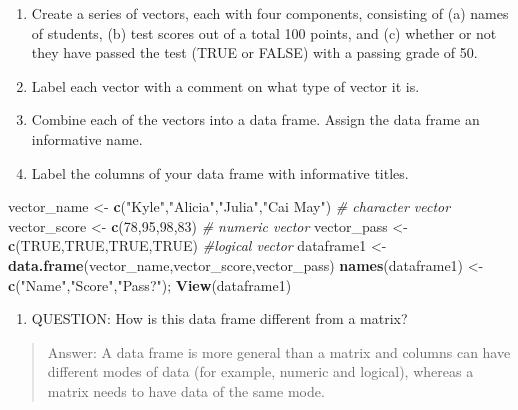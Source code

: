 \documentclass[]{article}
\newenvironment{Shaded}{\begin{snugshade}}{\end{snugshade}}
\newcommand{\CommentTok}[1]{\textcolor[rgb]{0.56,0.35,0.01}{\textit{#1}}}
\newcommand{\DecValTok}[1]{\textcolor[rgb]{0.00,0.00,0.81}{#1}}
\newcommand{\KeywordTok}[1]{\textcolor[rgb]{0.13,0.29,0.53}{\textbf{#1}}}
\newcommand{\NormalTok}[1]{#1}
\newcommand{\OtherTok}[1]{\textcolor[rgb]{0.56,0.35,0.01}{#1}}
\newcommand{\StringTok}[1]{\textcolor[rgb]{0.31,0.60,0.02}{#1}}
\providecommand{\tightlist}{%
  \setlength{\itemsep}{0pt}\setlength{\parskip}{0pt}}
\begin{document}
\begin{enumerate}
\def\labelenumi{\arabic{enumi}.}
\setcounter{enumi}{4}
\item
  Create a series of vectors, each with four components, consisting of
  (a) names of students, (b) test scores out of a total 100 points, and
  (c) whether or not they have passed the test (TRUE or FALSE) with a
  passing grade of 50.
\item
  Label each vector with a comment on what type of vector it is.
\item
  Combine each of the vectors into a data frame. Assign the data frame
  an informative name.
\item
  Label the columns of your data frame with informative titles.
\end{enumerate}

\begin{Shaded}
\begin{Highlighting}[]
\NormalTok{vector_name <-}\StringTok{ }\KeywordTok{c}\NormalTok{(}\StringTok{"Kyle"}\NormalTok{,}\StringTok{"Alicia"}\NormalTok{,}\StringTok{"Julia"}\NormalTok{,}\StringTok{"Cai May"}\NormalTok{) }\CommentTok{# character vector}
\NormalTok{vector_score <-}\StringTok{ }\KeywordTok{c}\NormalTok{(}\DecValTok{78}\NormalTok{,}\DecValTok{95}\NormalTok{,}\DecValTok{98}\NormalTok{,}\DecValTok{83}\NormalTok{) }\CommentTok{# numeric vector}
\NormalTok{vector_pass <-}\StringTok{ }\KeywordTok{c}\NormalTok{(}\OtherTok{TRUE}\NormalTok{,}\OtherTok{TRUE}\NormalTok{,}\OtherTok{TRUE}\NormalTok{,}\OtherTok{TRUE}\NormalTok{) }\CommentTok{#logical vector}
\NormalTok{dataframe1 <-}\StringTok{ }\KeywordTok{data.frame}\NormalTok{(vector_name,vector_score,vector_pass)}
\KeywordTok{names}\NormalTok{(dataframe1) <-}\StringTok{ }\KeywordTok{c}\NormalTok{(}\StringTok{"Name"}\NormalTok{,}\StringTok{"Score"}\NormalTok{,}\StringTok{"Pass?"}\NormalTok{); }\KeywordTok{View}\NormalTok{(dataframe1)}
\end{Highlighting}
\end{Shaded}

\begin{enumerate}
\def\labelenumi{\arabic{enumi}.}
\setcounter{enumi}{8}
\tightlist
\item
  QUESTION: How is this data frame different from a matrix?
\end{enumerate}

\begin{quote}
Answer: A data frame is more general than a matrix and columns can have
different modes of data (for example, numeric and logical), whereas a
matrix needs to have data of the same mode.
\end{quote}
\end{document}
